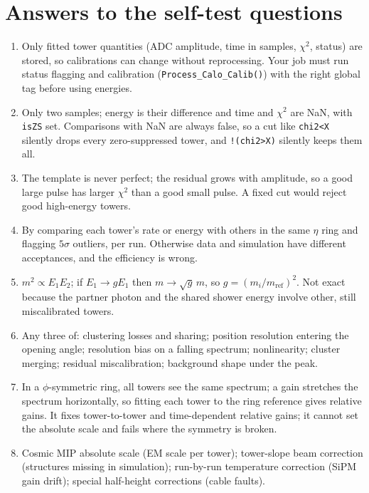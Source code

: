 \documentclass[11pt,letterpaper]{article}
\begin{document}
\appendix
\section{Answers to the self-test questions}
\begin{enumerate}[label=A\arabic*.]
\item Only fitted tower quantities (ADC amplitude, time in samples, $\chi^2$, status) are stored, so calibrations can change without reprocessing. Your job must run status flagging and calibration (\texttt{Process\_Calo\_Calib()}) with the right global tag before using energies.
\item Only two samples; energy is their difference and time and $\chi^2$ are NaN, with \texttt{isZS} set. Comparisons with NaN are always false, so a cut like \texttt{chi2<X} silently drops every zero-suppressed tower, and \texttt{!(chi2>X)} silently keeps them all.
\item The template is never perfect; the residual grows with amplitude, so a good large pulse has larger $\chi^2$ than a good small pulse. A fixed cut would reject good high-energy towers.
\item By comparing each tower's rate or energy with others in the same $\eta$ ring and flagging $5\sigma$ outliers, per run. Otherwise data and simulation have different acceptances, and the efficiency is wrong.
\item $m^2\propto E_1E_2$; if $E_1\to gE_1$ then $m\to\sqrt g\,m$, so $g=(m_i/m_{\mathrm{ref}})^2$. Not exact because the partner photon and the shared shower energy involve other, still miscalibrated towers.
\item Any three of: clustering losses and sharing; position resolution entering the opening angle; resolution bias on a falling spectrum; nonlinearity; cluster merging; residual miscalibration; background shape under the peak.
\item In a $\phi$-symmetric ring, all towers see the same spectrum; a gain stretches the spectrum horizontally, so fitting each tower to the ring reference gives relative gains. It fixes tower-to-tower and time-dependent relative gains; it cannot set the absolute scale and fails where the symmetry is broken.
\item Cosmic MIP absolute scale (EM scale per tower); tower-slope beam correction (structures missing in simulation); run-by-run temperature correction (SiPM gain drift); special half-height corrections (cable faults).

\end{enumerate}
\end{document}
